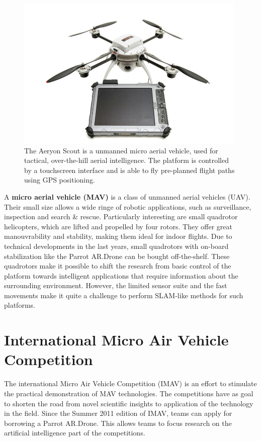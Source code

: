 \begin{figure}[htb]
\centering
\includegraphics[width=11.0cm]{images/aeryon-scout-tablet.jpg}
\caption{The Aeryon Scout is a unmanned micro aerial vehicle, used for tactical, over-the-hill aerial intelligence. The platform is controlled by a touchscreen interface and is able to fly pre-planned flight paths using GPS positioning.}
\label{fig:introduction_aeryon_scout}
\end{figure}

A \textbf{micro aerial vehicle (MAV)} is a class of unmanned aerial vehicles (UAV).
Their small size allows a wide ringe of robotic applications, such as surveillance, inspection and search \& rescue.
Particularly interesting are small quadrotor helicopters, which are lifted and propelled by four rotors.
They offer great manouvrability and stability, making them ideal for indoor flights.
Due to technical developments in the last years, small quadrotors with on-board stabilization like the Parrot AR.Drone can be bought off-the-shelf.
These quadrotors make it possible to shift the research from basic control of the platform towards intelligent applications that require information about the surrounding environment.
However, the limited sensor suite and the fast movements make it quite a challenge to perform SLAM-like methods for such platforms.



	\section{International Micro Air Vehicle Competition}
The international Micro Air Vehicle Competition (IMAV) is an effort to stimulate the practical demonstration of MAV technologies.
The competitions have as goal to shorten the road from novel scientific insights to application of the technology in the field.
Since the Summer 2011 edition of IMAV, teams can apply for borrowing a Parrot AR.Drone.
This allows teams to focus research on the artificial intelligence part of the competitions.


